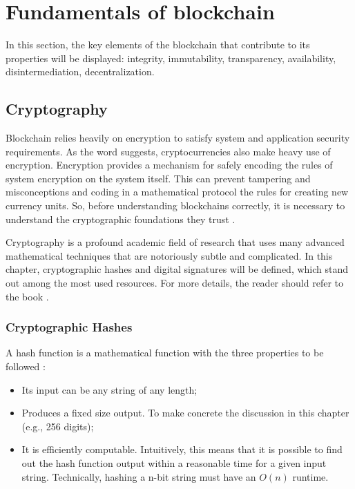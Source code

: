 \section{Fundamentals of blockchain}\label{sec:fundamentals}
In this section, the key elements of the blockchain that contribute to its properties will be displayed: integrity, immutability, transparency, availability, disintermediation, decentralization.

\subsection{Cryptography}\label{sec:criptografia}
Blockchain relies heavily on encryption to satisfy system and application security requirements. As the word suggests, cryptocurrencies also make heavy use of encryption. Encryption provides a mechanism for safely encoding the rules of system encryption on the system itself. This can prevent tampering and misconceptions and coding in a mathematical protocol the rules for creating new currency units. So, before understanding blockchains correctly, it is necessary to understand the cryptographic foundations they trust \cite{narayanan2016bitcoin}.

Cryptography is a profound academic field of research that uses many advanced mathematical techniques that are notoriously subtle and complicated. In this chapter, cryptographic hashes and digital signatures will be defined, which stand out among the most used resources. For more details, the reader should refer to the book \cite{narayanan2016bitcoin}.

\subsubsection{Cryptographic Hashes}\label{sec:hashesCriptograficos}
A hash function is a mathematical function with the three properties to be followed \cite{narayanan2016bitcoin}:

\begin{itemize}
\item  Its input can be any string of any length;
\item Produces a fixed size output. To make concrete the discussion in this chapter (e.g., 256 digits);
\item It is efficiently computable. Intuitively, this means that it is possible to find out the hash function output within a reasonable time for a given input string. Technically, hashing a n-bit string must have an $O(n)$ runtime.
\end{itemize}

